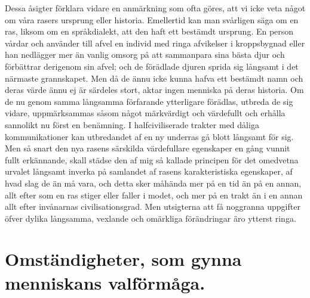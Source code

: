 Dessa åsigter förklara vidare en anmärkning som ofta göres, att vi icke veta något om våra rasers ursprung eller historia. Emellertid kan man svårligen säga om en ras, liksom om en språkdialekt, att den haft ett bestämdt ursprung. En person vårdar och använder till afvel en individ med ringa afvikelser i kroppsbygnad eller han nedlägger mer än vanlig omsorg på att sammanpara sina bästa djur och förbättrar derigenom sin afvel; och de förädlade djuren sprida sig långsamt i det närmaste grannskapet. Men då de ännu icke kunna hafva ett bestämdt namn och deras värde ännu ej är särdeles stort, aktar ingen menniska på deras historia. Om de nu genom samma långsamma förfarande ytterligare förädlas, utbreda de sig vidare, uppmärksammas såsom något märkvärdigt och värdefullt och erhålla sannolikt nu först en benämning. I halfciviliserade trakter med dåliga kommunikationer kan utbredandet af en ny underras gå blott långsamt för sig. Men så snart den nya rasens särskilda värdefullare egenskaper en gång vunnit fullt erkännande, skall städse den af mig så kallade principen för det omedvetna urvalet långsamt inverka på samlandet af rasens karakteristiska egenskaper, af hvad slag de än må vara, och detta sker måhända mer på en tid än på en annan, allt efter som en ras stiger eller faller i modet, och mer på en trakt än i en annan allt efter invånarnas civilisationsgrad. Men utsigterna att få noggranna uppgifter öfver dylika långsamma, vexlande och omärkliga förändringar äro ytterst ringa.



\section[Menniskans valförmåga]{Omständigheter, som gynna menniskans valförmåga.}


